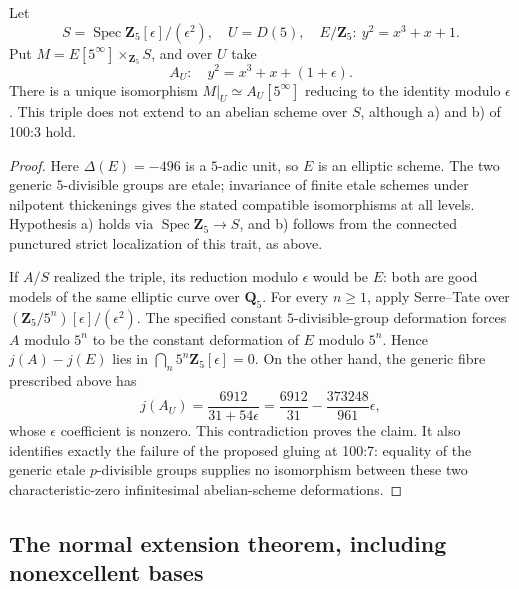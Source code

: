 \begin{proposition}\label{prop:C-RD5}
Let
\[
 S=\operatorname{Spec}\mathbf Z_5[\epsilon]/(\epsilon^2),\quad U=D(5),
 \quad E/\mathbf Z_5:\ y^2=x^3+x+1.
\]
Put $M=E[5^\infty]\times_{\mathbf Z_5}S$, and over $U$ take
\[
 A_U:\quad y^2=x^3+x+(1+\epsilon).
\]
There is a unique isomorphism $M|_U\simeq A_U[5^\infty]$ reducing to the
identity modulo $\epsilon$. This triple does not extend to an abelian
scheme over $S$, although a) and b) of 100:3 hold.
\end{proposition}
\begin{proof}
Here $\Delta(E)=-496$ is a $5$-adic unit, so $E$ is an elliptic scheme.
The two generic $5$-divisible groups are etale; invariance of finite
etale schemes under nilpotent thickenings gives the stated compatible
isomorphisms at all levels. Hypothesis a) holds via
$\operatorname{Spec}\mathbf Z_5\to S$, and b) follows from the connected
punctured strict localization of this trait, as above.

If $A/S$ realized the triple, its reduction modulo $\epsilon$ would be
$E$: both are good models of the same elliptic curve over $\mathbf Q_5$.
For every $n\geq1$, apply Serre--Tate over
$(\mathbf Z_5/5^n)[\epsilon]/(\epsilon^2)$. The specified constant
$5$-divisible-group deformation forces $A$ modulo $5^n$ to be the
constant deformation of $E$ modulo $5^n$. Hence
$j(A)-j(E)$ lies in $\bigcap_n5^n\mathbf Z_5[\epsilon]=0$.
On the other hand, the generic fibre prescribed above has
\[
 j(A_U)=\frac{6912}{31+54\epsilon}
 =\frac{6912}{31}-\frac{373248}{961}\epsilon,
\]
whose $\epsilon$ coefficient is nonzero. This contradiction proves the
claim. It also identifies exactly the failure of the proposed gluing
at 100:7: equality of the generic etale $p$-divisible groups supplies no
isomorphism between these two characteristic-zero infinitesimal
abelian-scheme deformations.
\end{proof}

\subsection{The normal extension theorem, including nonexcellent bases}

